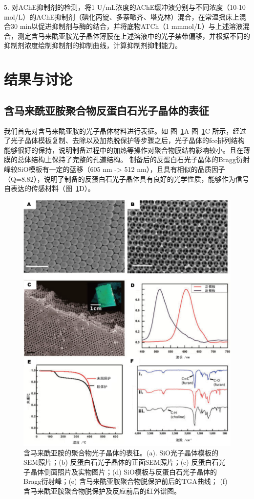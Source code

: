 5. 对AChE抑制剂的检测，将1 U/mL浓度的AChE缓冲液分别与不同浓度（10-10 mol/L）的AChE抑制剂（碘化丙锭、多萘哌齐、塔克林）混合，在常温摇床上混合30 min以促进抑制剂与酶的结合，并将底物ATCh（1 mmmol/L）与上述溶液混合，测定含马来酰亚胺光子晶体薄膜在上述溶液中的光子禁带偏移，并根据不同的抑制剂浓度绘制抑制剂的抑制曲线，计算抑制剂抑制能力。

\section{结果与讨论}
\subsection{含马来酰亚胺聚合物反蛋白石光子晶体的表征}

我们首先对含马来酰亚胺的光子晶体材料进行表征。如
	图~\ref{fig:maleimide-character}A-图~\ref{fig:maleimide-character}C
所示，经过了光子晶体模板复制、去除以及加热脱保护等步骤之后，光子晶体的fcc排列结构能够很好的保持，说明制备过程中的加热等操作对聚合物膜结构影响较小。且在薄膜的总体结构上保持了完整的孔道结构。
制备后的反蛋白石光子晶体的Bragg衍射峰较SiO模板有一定的蓝移（605 nm -> 512 nm），且具有相似的品质因子（Q=8.82），说明了制备的反蛋白石光子晶体具有良好的光学性质，能够作为信号自表达的传感材料（图~\ref{fig:maleimide-character}D）。
\begin{figure}[htbp]
  \centering
  \includegraphics[width=\linewidth]{figures/ch3/material-maleimide.png}
  \caption{含马来酰亚胺的聚合物光子晶体的表征。(a). SiO光子晶体模板的SEM照片；(b) 反蛋白石光子晶体的正面SEM照片；(c) 反蛋白石光子晶体侧面照片及实物图片；(d) SiO模板与反蛋白石光子晶体的Bragg衍射峰；(e) 含马来酰亚胺聚合物脱保护前后的TGA曲线； (f) 含马来酰亚胺聚合物脱保护及反应前后的红外谱图。}
  \label{fig:maleimide-character}
\end{figure}

